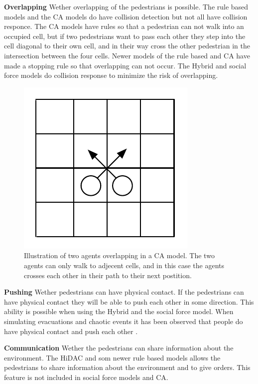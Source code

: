 \textbf{Overlapping} Wether overlapping of the pedestrians is possible. The rule 
based models and the CA models do have collision detection but not all have collision 
responce. The CA models have rules so that a pedestrian can not walk into an occupied 
cell, but if two pedestrians want to pass each other they step into the cell diagonal 
to their own cell, and in their way cross the other pedestrian in the intersection 
between the four cells. Newer models of the rule based and CA have made a stopping 
rule so that overlapping can not occur. The Hybrid and social force models do collision 
response to minimize the risk of overlapping. \cite{Comparison}

\begin{figure}
    \centering
    \includegraphics[scale=0.55]{Figures/Overlapping.pdf} 
    \caption[Overlapping]{Illustration of two agents overlapping in a CA model. The two agents can only walk to adjecent cells, and in
	     this case the agents crosses each other in their path to their next postition.}
    \label{Overlapping}
\end{figure}

\textbf{Pushing} Wether pedestrians can have physical contact. If the pedestrians 
can have physical contact they will be able to push each other in some direction. 
This ability is possible when using the Hybrid and the social force model. When 
simulating evacuations and chaotic events it has been observed that people do have 
physical contact and push each other \cite{self-org}.

\textbf{Communication} Wether the pedestrians can share information about the 
environment. The HiDAC and som newer rule based models allows the pedestrians 
to share information about the environment and to give orders. This feature is 
not included in social force models and CA. \cite{Comparison}

